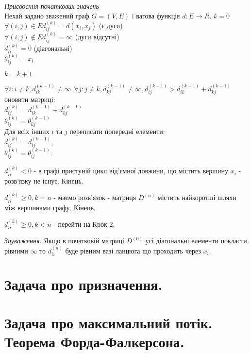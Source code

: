 \documentclass[12pt,a4paper]{article}
\newenvironment{slim_enumerate}{
\begin{enumerate}
  \setlength{\itemsep}{1pt}
  \setlength{\parskip}{0pt}
  \setlength{\parsep}{0pt}}
{\end{enumerate}}
\begin{document}
\begin{slim_enumerate}
  \item \emph{Присвоєння початкових значень}\\
Нехай задано зважений граф $G=(V,E)$ i вагова функція $d:E \rightarrow R$.
$k=0$\\
$\forall (i,j) \in E d_{ij}^{(k)}=d(x_i,x_j)$ (є дуги)\\
$\forall (i,j) \notin E d_{ij}^{(k)}=\infty$ (дуги відсутні)\\
$d_{ii}^{(k)}=0$ (діагональні)\\
$\theta_{ij}^{(k)}=x_i$
  \item $k=k+1$
  \item $\forall i: i \neq k, d_{ik}^{(k-1)} \neq \infty, \forall j: j \neq k, d_{kj}^{(k-1)} \neq \infty, d_{ij}^{(k-1)}>d_{ik}^{(k-1)}+d_{kj}^{(k-1)}$ оновити матриці:\\
$d_{ij}^{(k)}=d_{ik}^{(k-1)}+d_{kj}^{(k-1)}$\\
$\theta_{ij}^{(k)}=\theta_{kj}^{(k-1)}$\\
Для всіх інших $i$ та $j$ переписати попередні елементи:\\
$d_{ij}^{(k)}=d_{ij}^{(k-1)}$,\\
$\theta_{ij}^{(k)}=\theta_{ij}^{(k-1)}$.
  \item 
    \begin{slim_enumerate}
      \item $d_{ii}^{(k)} < 0$ - в графі пристуній цикл від’ємної довжини, що містить вершину $x_i$ - розв’язку не існує. Кінець.
      \item $d_{ii}^{(k)} \geq 0, k=n$ - маємо розв’язок - матриця $D^{(n)}$ містить найкоротші шляхи між вершинами графу. Кінець.
      \item $d_{ii}^{(k)} \geq 0, k<n$ - перейти на Крок 2.
    \end{slim_enumerate}
\end{slim_enumerate}

\emph{Зауваження.} Якщо в початковій матриці $D^{(0)}$ усі діагональні елементи покласти рівними $\infty$ то $d_{ii}^{(n)}$ буде рівним вазі ланцюга що проходить через $x_i$.

\clearpage

\section{Задача про призначення.}

\clearpage

\section{Задача про максимальний потік. Теорема Форда-Фалкерсона.}
\end{document}
